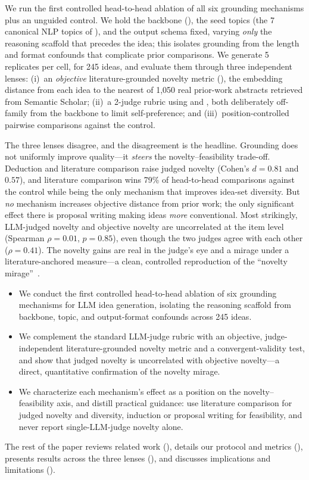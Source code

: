  We run the first controlled head-to-head ablation of all six grounding mechanisms plus an unguided control. We hold the backbone (\gptfourone), the seed topics (the 7 canonical NLP topics of \citet{si2024can}), and the output schema fixed, varying \emph{only} the reasoning scaffold that precedes the idea; this isolates grounding from the length and format confounds that complicate prior comparisons. We generate 5 replicates per cell, for 245 ideas, and evaluate them through three independent lenses: (i)~an \emph{objective} literature-grounded novelty metric (\lgn), the embedding distance from each idea to the nearest of 1{,}050 real prior-work abstracts retrieved from Semantic Scholar; (ii)~a 2-judge rubric using \claudesonnet and \geminiflash, both deliberately off-family from the backbone to limit self-preference; and (iii)~position-controlled pairwise comparisons against the control.

 The three lenses disagree, and the disagreement is the headline. Grounding does not uniformly improve quality---it \emph{steers} the novelty--feasibility trade-off. Deduction and literature comparison raise judged novelty (Cohen's $d = 0.81$ and $0.57$), and literature comparison wins 79\% of head-to-head comparisons against the control while being the only mechanism that improves idea-set diversity. But \emph{no} mechanism increases objective distance from prior work; the only significant effect there is proposal writing making ideas \emph{more} conventional. Most strikingly, LLM-judged novelty and objective novelty are uncorrelated at the item level (Spearman $\rho = 0.01$, $p = 0.85$), even though the two judges agree with each other ($\rho = 0.41$). The novelty gains are real in the judge's eye and a mirage under a literature-anchored measure---a clean, controlled reproduction of the ``novelty mirage''~\citep{rqbench2026}.

\begin{itemize}[leftmargin=*,itemsep=0pt,topsep=0pt]
    \item We conduct the first controlled head-to-head ablation of six grounding mechanisms for LLM idea generation, isolating the reasoning scaffold from backbone, topic, and output-format confounds across 245 ideas.
    \item We complement the standard LLM-judge rubric with an objective, judge-independent literature-grounded novelty metric and a convergent-validity test, and show that judged novelty is uncorrelated with objective novelty---a direct, quantitative confirmation of the novelty mirage.
    \item We characterize each mechanism's effect as a position on the novelty--feasibility axis, and distill practical guidance: use literature comparison for judged novelty and diversity, induction or proposal writing for feasibility, and never report single-LLM-judge novelty alone.
\end{itemize}

The rest of the paper reviews related work (), details our protocol and metrics (), presents results across the three lenses (), and discusses implications and limitations ().
